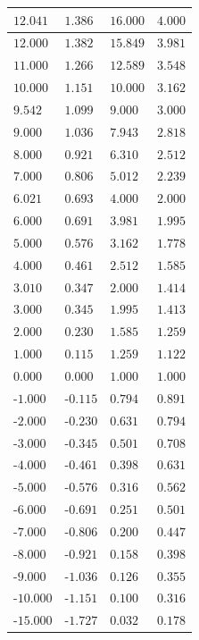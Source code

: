 \begin{center}
{\begin{tabular}{l|l|l|l}
		\textbf{$12.041$} & $1.386$ & \textbf{$16.000$} & \textbf{$4.000$} \\ \hline
		\textbf{$12.000$} & $1.382$ & $15.849$ & $3.981$ \\ \hline
		$11.000$ & $1.266$ & $12.589$ & $3.548$ \\ \hline
		\textbf{$10.000$} & $1.151$ & \textbf{$10.000$} & $3.162$ \\ \hline
		$9.542$ & $1.099$ & $9.000$ & $3.000$ \\ \hline
		$9.000$ & $1.036$ & $7.943$ & $2.818$ \\ \hline
		$8.000$ & $0.921$ & $6.310$ & $2.512$ \\ \hline
		$7.000$ & $0.806$ & $5.012$ & $2.239$ \\ \hline
		\textbf{$6.021$} & \textbf{$0.693$} & \textbf{$4.000$} & \textbf{$2.000$} \\ \hline
		$6.000$ & $0.691$ & $3.981$ & $1.995$ \\ \hline
		$5.000$ & $0.576$ & $3.162$ & $1.778$ \\ \hline
		$4.000$ & $0.461$ & $2.512$ & $1.585$ \\ \hline
		\textbf{$3.010$} & \textbf{$0.347$} & \textbf{$2.000$} & \textbf{$1.414$} \\ \hline
		$3.000$ & $0.345$ & $1.995$ & $1.413$ \\ \hline
		$2.000$ & $0.230$ & $1.585$ & $1.259$ \\ \hline
		$1.000$ & $0.115$ & $1.259$ & $1.122$ \\ \hline
		$0.000$ & $0.000$ & $1.000$ & $1.000$ \\ \hline
		-$1.000$ & -$0.115$ & $0.794$ & $0.891$ \\ \hline
		-$2.000$ & -$0.230$ & $0.631$ & $0.794$ \\ \hline
		-$3.000$ & -$0.345$ & $0.501$ & $0.708$ \\ \hline
		-$4.000$ & -$0.461$ & $0.398$ & $0.631$ \\ \hline
		-$5.000$ & -$0.576$ & $0.316$ & $0.562$ \\ \hline
		-$6.000$ & -$0.691$ & $0.251$ & $0.501$ \\ \hline
		-$7.000$ & -$0.806$ & $0.200$ & $0.447$ \\ \hline
		-$8.000$ & -$0.921$ & $0.158$ & $0.398$ \\ \hline
		-$9.000$ & -$1.036$ & $0.126$ & $0.355$ \\ \hline
		-$10.000$ & -$1.151$ & $0.100$ & $0.316$ \\ \hline
		-$15.000$ & -$1.727$ & $0.032$ & $0.178$ \\ \hline

\end{tabular}}
\end{center}
